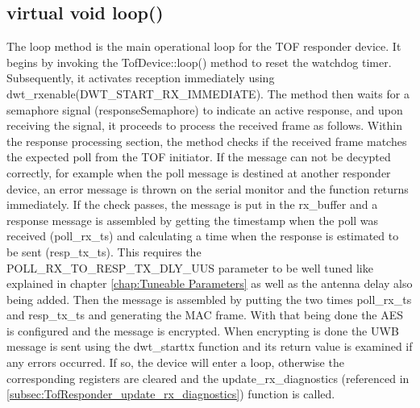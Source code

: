 \subsection{virtual void loop()}
\label{subsec:TofResponder_loop}
The loop method is the main operational loop for the TOF responder device. 
It begins by invoking the TofDevice::loop() method to reset the watchdog timer. 
Subsequently, it activates reception immediately using dwt\_rxenable(DWT\_START\_RX\_IMMEDIATE). 
The method then waits for a semaphore signal (responseSemaphore) to indicate an active response, and upon receiving the signal, it proceeds to process the received frame as follows.
\vspace{4pt}
\newline
Within the response processing section, the method checks if the received frame matches the expected poll from the TOF initiator. 
If the message can not be decypted correctly, for example when the poll message is destined at another responder device, an error message is thrown on the serial monitor and the function returns immediately. 
\vspace{4pt}
\newline
If the check passes, the message is put in the rx\_buffer and a response message is assembled by getting the timestamp when the poll was received (poll\_rx\_ts) and calculating a time when the response is estimated to be sent (resp\_tx\_ts). 
This requires the POLL\_RX\_TO\_RESP\_TX\_DLY\_UUS parameter to be well tuned like explained in chapter \ref{chap:Tuneable Parameters} as well as the antenna delay also being added. 
\vspace{4pt}
\newline
Then the message is assembled by putting the two times poll\_rx\_ts and resp\_tx\_ts and generating the MAC frame. 
With that being done the AES is configured and the message is encrypted. 
When encrypting is done the UWB message is sent using the dwt\_starttx function and its return value is examined if any errors occurred. 
If so, the device will enter a loop, otherwise the corresponding registers are cleared and the update\_rx\_diagnostics (referenced in \ref{subsec:TofResponder_update_rx_diagnostics}) function is called. 

